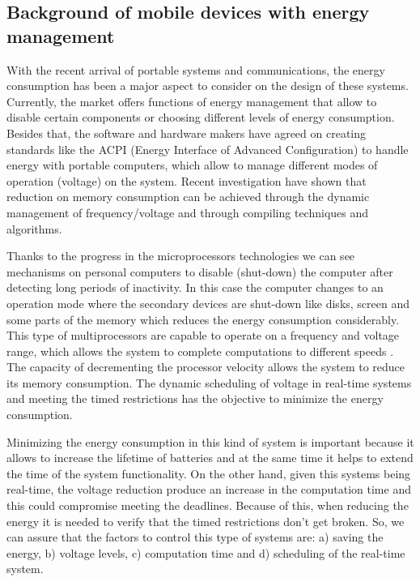 \documentclass[conference]{IEEEtran}
\begin{document}
 \subsection{Background of mobile devices with energy management}

 With the recent arrival of portable systems and communications, the energy consumption has been a major aspect to consider on the design of these systems. Currently, the market offers functions of energy management that allow to disable certain components or choosing different levels of energy consumption. Besides that, the software and hardware makers have agreed on creating standards like the ACPI (Energy Interface of Advanced Configuration) to handle energy with portable computers, which allow to manage different modes of operation (voltage) on the system. Recent investigation have shown that reduction on memory consumption can be achieved through the dynamic management of frequency/voltage and through compiling techniques and algorithms.
 
 Thanks to the progress in the microprocessors technologies we can see mechanisms on personal computers to disable (shut-down) the computer after detecting long periods of inactivity. In this case the computer changes to an operation mode where the secondary devices are shut-down like disks, screen and some parts of the memory which reduces the energy consumption considerably. This type of multiprocessors are capable to operate on a frequency and voltage range, which allows the system to complete computations to different speeds \cite{PADM01}. The capacity of decrementing the processor velocity allows the system to reduce its memory consumption. The dynamic scheduling of voltage in real-time systems and meeting the timed restrictions has the objective to minimize the energy consumption.

 Minimizing the energy consumption in this kind of system is important because it allows to increase the lifetime of batteries and at the same time it helps to extend the time of the system functionality. On the other hand, given this systems being real-time, the voltage reduction produce an increase in the computation time and this could compromise meeting the deadlines. Because of this, when reducing the energy it is needed to verify that the timed restrictions don't get broken. So, we can assure that the factors to control this type of systems are: a) saving the energy, b) voltage levels, c) computation time and d) scheduling of the real-time system.
 
\end{document}
